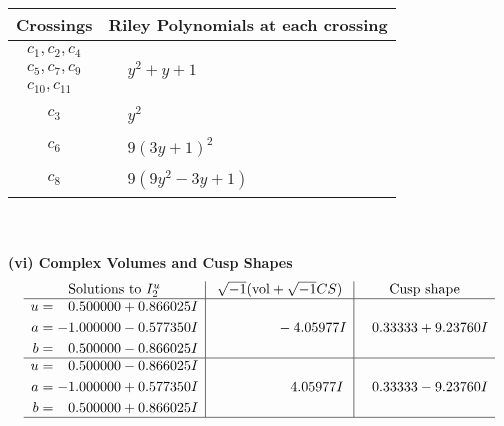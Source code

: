 \documentclass[1p]{elsarticle_modified}
\theoremstyle{definition}
\newcommand{\I}{\sqrt{-1}}
\begin{document}
\begin{tabular}{m{50pt}|m{274pt}}
Crossings & \hspace{64pt}Riley Polynomials at each crossing \\
\hline $$\begin{aligned}c_{1},c_{2},c_{4}\\c_{5},c_{7},c_{9}\\c_{10},c_{11}\end{aligned}$$&$\begin{aligned}
&y^2+y+1
\end{aligned}$\\
\hline $$\begin{aligned}c_{3}\end{aligned}$$&$\begin{aligned}
&y^2
\end{aligned}$\\
\hline $$\begin{aligned}c_{6}\end{aligned}$$&$\begin{aligned}
&9(3 y+1)^2
\end{aligned}$\\
\hline $$\begin{aligned}c_{8}\end{aligned}$$&$\begin{aligned}
&9(9 y^2-3 y+1)
\end{aligned}$\\
\hline
\end{tabular}\\~\\
\newpage\flushleft \textbf{(vi) Complex Volumes and Cusp Shapes}
$$\begin{array}{c|c|c}  
\text{Solutions to }I^u_{2}& \I (\text{vol} + \sqrt{-1}CS) & \text{Cusp shape}\\
 \hline 
\begin{aligned}
u &= \phantom{-}0.500000 + 0.866025 I \\
a &= -1.000000 - 0.577350 I \\
b &= \phantom{-}0.500000 - 0.866025 I\end{aligned}
 & \phantom{-0.000000 } -4.05977 I & \phantom{-}0.33333 + 9.23760 I \\ \hline\begin{aligned}
u &= \phantom{-}0.500000 - 0.866025 I \\
a &= -1.000000 + 0.577350 I \\
b &= \phantom{-}0.500000 + 0.866025 I\end{aligned}
 & \phantom{-0.000000 -}4.05977 I & \phantom{-}0.33333 - 9.23760 I\\
 \hline 
 \end{array}$$\newpage\newpage\renewcommand{\arraystretch}{1}
\end{document}
